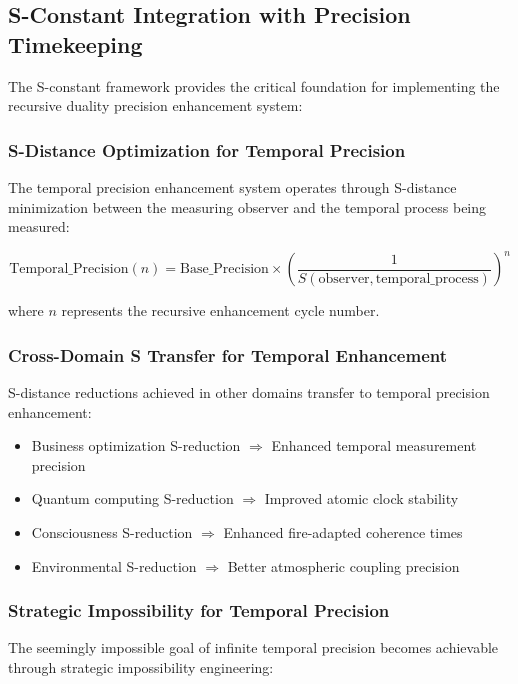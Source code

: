 \documentclass[12pt,a4paper]{article}
\begin{document}
{{{{{{{{{{{{{{\subsection{S-Constant Integration with Precision Timekeeping}

The S-constant framework provides the critical foundation for implementing the recursive duality precision enhancement system:

\subsubsection{S-Distance Optimization for Temporal Precision}

The temporal precision enhancement system operates through S-distance minimization between the measuring observer and the temporal process being measured:

\begin{equation}
\text{Temporal\_Precision}(n) = \text{Base\_Precision} \times \left(\frac{1}{S(\text{observer}, \text{temporal\_process})}\right)^n
\end{equation}

where $n$ represents the recursive enhancement cycle number.

\subsubsection{Cross-Domain S Transfer for Temporal Enhancement}

S-distance reductions achieved in other domains transfer to temporal precision enhancement:

\begin{itemize}
\item Business optimization S-reduction $\Rightarrow$ Enhanced temporal measurement precision
\item Quantum computing S-reduction $\Rightarrow$ Improved atomic clock stability
\item Consciousness S-reduction $\Rightarrow$ Enhanced fire-adapted coherence times
\item Environmental S-reduction $\Rightarrow$ Better atmospheric coupling precision
\end{itemize}

\subsubsection{Strategic Impossibility for Temporal Precision}

The seemingly impossible goal of infinite temporal precision becomes achievable through strategic impossibility engineering:

}}}}}}}}}}}}}}
\end{document}
